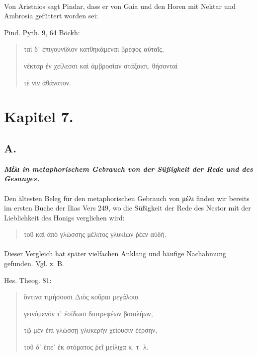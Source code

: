 \documentclass[a4paper, 11pt, oneside]{article}
\begin{document}
\paragraph{}
Von Aristaios sagt Pindar, dass er von Gaia und den Horen mit Nektar und Ambrosia gefüttert worden sei:

Pind. Pyth. 9, 64 Böckh:
\begin{quotation}
ταὶ δ᾽ ἐπιγουνίδιον κατθηκάμεναι βρέφος αὑταῖς,

νέκταρ ἐν χείλεσσι καὶ ἀμβροσίαν στάξοισι, θήσονταί

τὲ νιν ἀθάνατον.
\end{quotation}
\paragraph{}
\clearpage
\section{Kapitel 7.}
\subsection{A.}
\begin{center}
\textbf{\emph{Μέλι in metaphorischem Gebrauch von der Süßigkeit der Rede und des Gesanges.}}
\end{center}
\paragraph{}
Den ältesten Beleg für den metaphorischen Gebrauch von μέλι finden wir bereits im ersten Buche der Ilias Vers 249, wo die Süßigkeit der Rede des Nestor mit der Lieblichkeit des Honigs verglichen wird:
\begin{quotation}
τοῦ καὶ ἀπὸ γλώσσης μέλιτος γλυκίων ῥέεν αὐδή.
\end{quotation}
\paragraph{}
Dieser Vergleich hat später vielfachen Anklang und häufige Nachahmung gefunden. Vgl. z. B.

Hes. Theog. 81:
\begin{quotation}
ὃντινα τιμήσουσι Διὸς κοῦραι μεγάλοιο

γεινόμενόν τ᾽ ἐσίδωσι διοτρεφέων βασιλήων,

τῷ μὲν ἐπὶ γλώσσῃ γλυκερὴν χείουσιν ἐέρσην,

τοῦ δ᾽ ἔπε᾽ ἐκ στόματος ῥεῖ μείλιχα κ. τ. λ.
\end{quotation}
\end{document}

